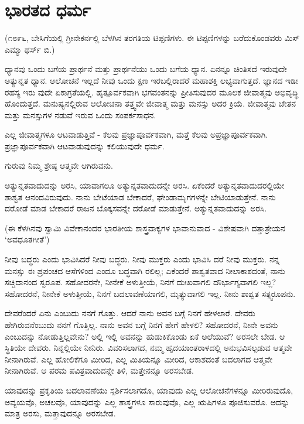 
\chapter{ಭಾರತದ ಧರ್ಮ}

(೧೮೯೬, ಬೇಸಿಗೆಯಲ್ಲಿ ಗ್ರೀನೇಕರ್ನಲ್ಲಿ ಬೆಳಗಿನ ತರಗತಿಯ ಟಿಪ್ಪಣಿಗಳು. ಈ ಟಿಪ್ಪಣಿಗಳನ್ನು ಬರೆದುಕೊಂಡವರು ಮಿಸ್ ಎಮ್ಮಾ ಥರ್ಸ್ ಬಿ.)

ಧ್ಯಾನವು ಒಂದು ಬಗೆಯ ಪ್ರಾರ್ಥನೆ ಮತ್ತು ಪ್ರಾರ್ಥನೆಯು ಒಂದು ಬಗೆಯ ಧ್ಯಾನ. ಏನನ್ನೂ ಚಿಂತಿಸದೆ ಇರುವುದೇ ಅತ್ಯುನ್ನತ ಧ್ಯಾನ. ಆಲೋಚನೆ ಇಲ್ಲದೆ ನೀವು ಒಂದು ಕ್ಷಣ ಇರಬಲ್ಲಿರಾದರೆ ಮಹಾಶಕ್ತಿ ಲಭ್ಯವಾಗುತ್ತದೆ. ಜ್ಞಾನದ ಇಡೀ ರಹಸ್ಯ ಇರು ವುದೇ ಏಕಾಗ್ರತೆಯಲ್ಲಿ. ಹೃತ್ಪೂರ್ವಕವಾಗಿ ಭಗವಂತನನ್ನು ಪ್ರೀತಿಸುವುದರ ಮೂಲಕ ಜೀವಾತ್ಮವು ಅಭಿವೃದ್ಧಿ ಹೊಂದುತ್ತದೆ. ಮನುಷ್ಯನಲ್ಲಿರುವ ಆಲೋಚನಾ ತತ್ತ್ವವೇ ಜೀವಾತ್ಮ ಮತ್ತು ಮನಸ್ಸು ಅದರ ಕ್ರಿಯೆ. ಜೀವಾತ್ಮವು ಚೇತನ ಮತ್ತು ಮನಸ್ಸುಗಳ ನಡುವೆ ಇರುವ ಒಂದು ಸಂಪರ್ಕಸಾಧನ.

ಎಲ್ಲ ಜೀವಾತ್ಮಗಳೂ ಆಟವಾಡುತ್ತಿವೆ - ಕೆಲವು ಪ್ರಜ್ಞಾಪೂರ್ವಕವಾಗಿ, ಮತ್ತೆ ಕೆಲವು ಅಪ್ರಜ್ಞಾಪೂರ್ವಕವಾಗಿ. ಪ್ರಜ್ಞಾಪೂರ್ವಕವಾಗಿ ಆಟವಾಡುವುದನ್ನು ಕಲಿಯುವುದೇ ಧರ್ಮ.

ಗುರುವು ನಿಮ್ಮ ಶ್ರೇಷ್ಠ ಆತ್ಮವೇ ಆಗಿರುವನು.

ಅತ್ಯುನ್ನತವಾದುದನ್ನು ಅರಸಿ, ಯಾವಾಗಲೂ ಅತ್ಯುನ್ನತವಾದುದನ್ನೇ ಅರಸಿ. ಏಕೆಂದರೆ ಅತ್ಯುನ್ನತವಾದುದರಲ್ಲಿಯೇ ಶಾಶ್ವತ ಆನಂದವಿರುವುದು. ನಾನು ಬೇಟೆಯಾಡ ಬೇಕಾದರೆ, ಘೇಂಡಾಮೃಗಗಳನ್ನೇ ಬೇಟಿಯಾಡುತ್ತೇನೆ. ನಾನು ದರೋಡೆ ಮಾಡ ಬೇಕಾದರೆ ರಾಜನ ಬೊಕ್ಕಸವನ್ನೇ ದರೋಡೆ ಮಾಡುತ್ತೇನೆ. ಅತ್ಯುನ್ನತವಾದುದನ್ನು ಅರಸಿ.

(ಈ ಕೆಳಗಿನವು ಸ್ವಾಮಿ ವಿವೇಕಾನಂದರ ಭಾರತೀಯ ಶಾಸ್ತ್ರವಾಕ್ಯಗಳ ಭಾವಾನುವಾದ - ವಿಶೇಷವಾಗಿ ದತ್ತಾತ್ರೇಯನ ‘ಅವಧೂತಗೀತೆ’)

ನೀವು ಬದ್ಧರು ಎಂದು ಭಾವಿಸಿದರೆ ನೀವು ಬದ್ಧರು. ನೀವು ಮುಕ್ತರು ಎಂದು ಭಾವಿಸಿ ದರೆ ನೀವು ಮುಕ್ತರು. ನನ್ನ ಮನಸ್ಸು ಈ ಪ್ರಪಂಚದ ಆಸೆಗಳಿಂದ ಎಂದೂ ಬದ್ಧವಾಗಿ ರಲಿಲ್ಲ; ಏಕೆಂದರೆ ಶಾಶ್ವತವಾದ ನೀಲಾಕಾಶದಂತೆ, ನಾನು ಸಚ್ಚಿದಾನಂದ ಸ್ವರೂಪ. ಸಹೋದರನೇ, ನೀನೇಕೆ ಅಳುತ್ತೀಯೆ, ನಿನಗೆ ದುಃಖವಾಗಲಿ ದೌರ್ಭಾಗ್ಯವಾಗಲಿ ಇಲ್ಲ? ಸಹೋದರನೆ, ನೀನೇಕೆ ಅಳುತ್ತೀಯೆ, ನಿನಗೆ ಬದಲಾವಣೆಯಾಗಲಿ, ಮೃತ್ಯುವಾಗಲಿ ಇಲ್ಲ. ನೀನು ಶಾಶ್ವತ ಸತ್ಸ್ವರೂಪನು.

ದೇವರೆಂದರೆ ಏನು ಎಂಬುದು ನನಗೆ ಗೊತ್ತು. ಆದರೆ ನಾನು ಅವನ ಬಗ್ಗೆ ನಿನಗೆ ಹೇಳಲಾರೆ. ದೇವರು ಹೇಗಿರುವನೆಂಬುದು ನನಗೆ ಗೊತ್ತಿಲ್ಲ. ನಾನು ಅವನ ಬಗ್ಗೆ ನಿನಗೆ ಹೇಗೆ ಹೇಳಲಿ? ಸಹೋದರನೆ, ನೀನೇ ಅವನು ಎಂಬುದನ್ನು ನೋಡುತ್ತಿಲ್ಲವೇನು? ಅಲ್ಲಿ ಇಲ್ಲಿ ಅವನನ್ನು ಹುಡುಕಿಕೊಂಡು ಏಕೆ ಅಲೆಯುವೆ? ಅರಸಲೇ ಬೇಡ. ಆ ಸ್ಥಿತಿಯೇ ದೇವರು. ನಿನ್ನಲ್ಲಿಯೇ ನೀನಿರು. ವಿವರಿಸಲಾಗದ, ನಮ್ಮ ಹೃದಯಾಂತರಾಳದಲ್ಲಿ ಅನುಭವಿಸಲ್ಪಡುವ ಆತ್ಮವೇ ನೀನಾಗಿರುವೆ. ಎಲ್ಲ ಹೋಲಿಕೆಗೂ ಮೀರಿದ, ಎಲ್ಲ ಮಿತಿಯನ್ನೂ ಮೀರಿದ, ಆಕಾಶದಂತೆ ಬದಲಾಗದ ಆತ್ಮವೇ ನೀನಾಗಿರುವೆ. ಆ ಪರಮ ಪವಿತ್ರವಾದುದನ್ನೇ ತಿಳಿ, ಮತ್ತೇನನ್ನೂ ಅರಸಬೇಡ.

ಯಾವುದನ್ನು ಪ್ರಕೃತಿಯ ಬದಲಾವಣೆಯು ಸ್ಪರ್ಶಿಸಲಾಗದೊ, ಯಾವುದು ಎಲ್ಲ ಆಲೋಚನೆಗಳನ್ನೂ ಮೀರಿರುವುದೊ, ಅವ್ಯಯವೊ, ಅಚಲವೊ, ಯಾವುದನ್ನು ಎಲ್ಲ ಶಾಸ್ತ್ರಗಳೂ ಸಾರುವುವೊ, ಎಲ್ಲ ಋಷಿಗಳೂ ಪೂಜಿಸುವರೊ. ಅದನ್ನು ಮಾತ್ರ ಅರಸು, ಮತ್ತಾವುದನ್ನೂ ಅರಸಬೇಡ.

